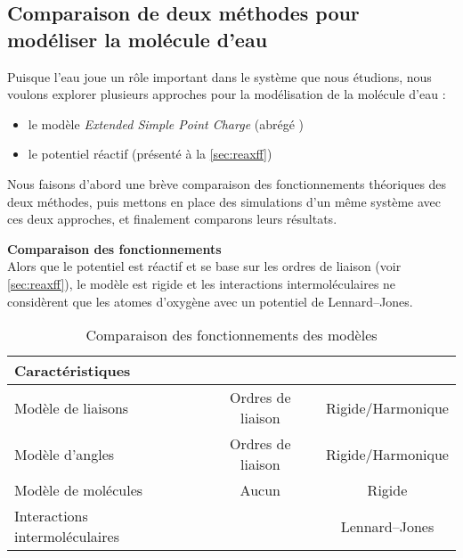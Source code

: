 \subsection{Comparaison de deux méthodes pour modéliser la molécule d'eau} \label{sec:h2o}

Puisque l'eau joue un rôle important dans le système que nous étudions, nous voulons explorer plusieurs approches pour la modélisation de la molécule d'eau :
\begin{itemize}
    \item le modèle \emph{Extended Simple Point Charge} (abrégé \spce{})\cite{pullman_interaction_1981}\cite{berendsen_missing_1987}
    \item le potentiel réactif \reaxff{} (présenté à la \autoref{sec:reaxff})
\end{itemize}

Nous faisons d'abord une brève comparaison des fonctionnements théoriques des deux méthodes, puis mettons en place des simulations d'un même système avec ces deux approches, et finalement comparons leurs résultats.

\textbf{Comparaison des fonctionnements}\\
Alors que le potentiel \reaxff{} est réactif et se base sur les ordres de liaison (voir \autoref{sec:reaxff}), le modèle \spce{} est rigide et les interactions intermoléculaires ne considèrent que les atomes d'oxygène avec un potentiel de Lennard--Jones.

\begin{table}[h!]
    \centering
    \begin{tabular}{l || c | c}
        \hline
        Caractéristiques               & \reaxff{}         & \spce{}           \\
        \hline
        Modèle de liaisons             & Ordres de liaison & Rigide/Harmonique \\
        Modèle d'angles                & Ordres de liaison & Rigide/Harmonique \\
        Modèle de molécules            & Aucun             & Rigide            \\
        Interactions intermoléculaires & \reaxff{}         & Lennard--Jones    \\
        \hline
    \end{tabular}
    \caption{Comparaison des fonctionnements des modèles}
    \label{tab:comparaison_modeles}
\end{table}


